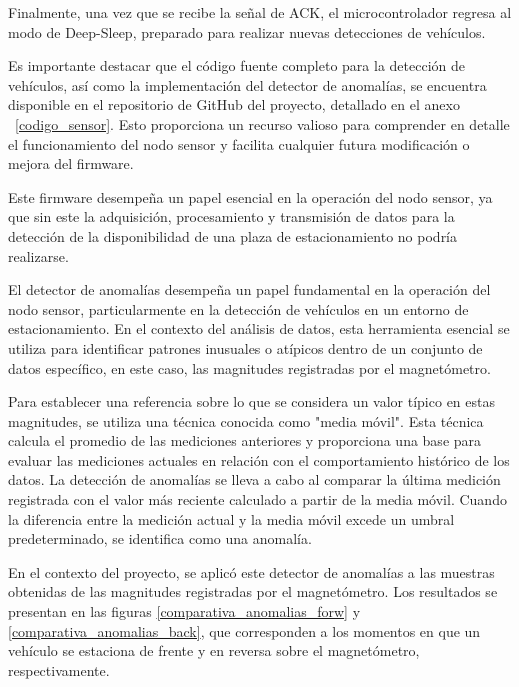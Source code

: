 Finalmente, una vez que se recibe la señal de ACK, el microcontrolador regresa al modo de Deep-Sleep, preparado para realizar nuevas detecciones de vehículos.

Es importante destacar que el código fuente completo para la detección de vehículos, así como la implementación del detector de anomalías, se encuentra disponible en el repositorio de GitHub del proyecto, detallado en el anexo ~\ref{codigo_sensor}. Esto proporciona un recurso valioso para comprender en detalle el funcionamiento del nodo sensor y facilita cualquier futura modificación o mejora del firmware.

Este firmware desempeña un papel esencial en la operación del nodo sensor, ya que sin este la adquisición, procesamiento y transmisión de datos para la detección de la disponibilidad de una plaza de estacionamiento no podría realizarse.


\label{detector_anomalias}
El detector de anomalías desempeña un papel fundamental en la operación del nodo sensor, particularmente en la detección de vehículos en un entorno de estacionamiento. En el contexto del análisis de datos, esta herramienta esencial se utiliza para identificar patrones inusuales o atípicos dentro de un conjunto de datos específico, en este caso, las magnitudes registradas por el magnetómetro.

Para establecer una referencia sobre lo que se considera un valor típico en estas magnitudes, se utiliza una técnica conocida como "media móvil". Esta técnica calcula el promedio de las mediciones anteriores y proporciona una base para evaluar las mediciones actuales en relación con el comportamiento histórico de los datos. La detección de anomalías se lleva a cabo al comparar la última medición registrada con el valor más reciente calculado a partir de la media móvil. Cuando la diferencia entre la medición actual y la media móvil excede un umbral predeterminado, se identifica como una anomalía.

En el contexto del proyecto, se aplicó este detector de anomalías a las muestras obtenidas de las magnitudes registradas por el magnetómetro. Los resultados se presentan en las figuras \ref{comparativa_anomalias_forw} y \ref{comparativa_anomalias_back}, que corresponden a los momentos en que un vehículo se estaciona de frente y en reversa sobre el magnetómetro, respectivamente.

